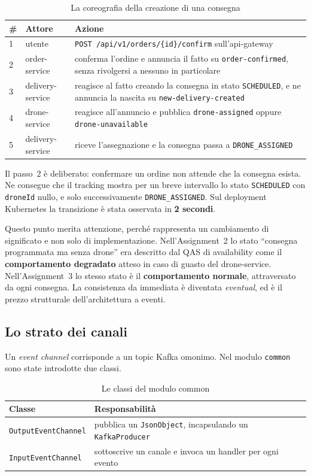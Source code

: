 \documentclass[12pt,a4paper]{article}
\begin{document}
\begin{table}[H]
\centering
\caption{La coreografia della creazione di una consegna}
\label{tab:coreografia}
\begin{tabularx}{\textwidth}{llX}
\toprule
\textbf{\#} & \textbf{Attore} & \textbf{Azione} \\
\midrule
1 & utente & \texttt{POST /api/v1/orders/\{id\}/confirm} sull'api-gateway \\
2 & order-service & conferma l'ordine e annuncia il fatto su \texttt{order-confirmed}, senza rivolgersi a nessuno in particolare \\
3 & delivery-service & reagisce al fatto creando la consegna in stato \texttt{SCHEDULED}, e ne annuncia la nascita su \texttt{new-delivery-created} \\
4 & drone-service & reagisce all'annuncio e pubblica \texttt{drone-assigned} oppure \texttt{drone-unavailable} \\
5 & delivery-service & riceve l'assegnazione e la consegna passa a \texttt{DRONE\_ASSIGNED} \\
\bottomrule
\end{tabularx}
\end{table}

Il passo~2 \`e deliberato: confermare un ordine non attende che la consegna esista. Ne consegue che
il tracking mostra per un breve intervallo lo stato \texttt{SCHEDULED} con \texttt{droneId} nullo, e
solo successivamente \texttt{DRONE\_ASSIGNED}. Sul deployment Kubernetes la transizione \`e stata
osservata in \textbf{2 secondi}.

Questo punto merita attenzione, perch\'e rappresenta un cambiamento di significato e non solo di
implementazione. Nell'Assignment~2 lo stato ``consegna programmata ma senza drone'' era descritto dal
QAS di availability come il \textbf{comportamento degradato} atteso in caso di guasto del
drone-service. Nell'Assignment~3 lo stesso stato \`e il \textbf{comportamento normale}, attraversato
da ogni consegna. La consistenza da immediata \`e diventata \emph{eventual}, ed \`e il prezzo
strutturale dell'architettura a eventi.

\subsection{Lo strato dei canali}

Un \emph{event channel} corrisponde a un topic
Kafka omonimo. Nel modulo \texttt{common} sono state introdotte due classi.

\begin{table}[H]
\centering
\caption{Le classi del modulo common}
\begin{tabularx}{\textwidth}{lX}
\toprule
\textbf{Classe} & \textbf{Responsabilit\`a} \\
\midrule
\texttt{OutputEventChannel} & pubblica un \texttt{JsonObject}, incapsulando un \texttt{KafkaProducer} \\
\texttt{InputEventChannel} & sottoscrive un canale e invoca un handler per ogni evento \\
\bottomrule
\end{tabularx}
\end{table}
\end{document}
